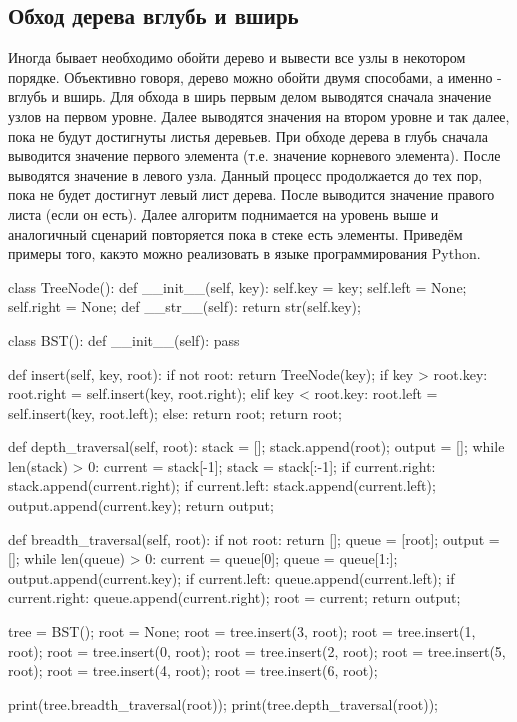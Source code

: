 \subsection{Обход дерева вглубь и вширь}

Иногда бывает необходимо обойти дерево и вывести все узлы в некотором порядке.
Объективно говоря, дерево можно обойти двумя способами, а именно - вглубь и вширь.
Для обхода в ширь первым делом выводятся сначала значение узлов на первом уровне.
Далее выводятся значения на втором уровне и так далее, пока не будут достигнуты
листья деревьев. При обходе дерева в глубь сначала выводится значение первого элемента (т.е. значение 
корневого элемента). После выводятся значение в левого узла. Данный процесс продолжается до тех пор, 
пока не будет достигнут левый лист дерева. После выводится значение правого листа (если он есть).
Далее алгоритм поднимается на уровень выше и аналогичный сценарий повторяется пока в стеке 
есть элементы. Приведём примеры того, какэто можно реализовать в языке программирования Python.

\begin{python}
class TreeNode():
	def __init__(self, key):
		self.key = key;
		self.left = None;
		self.right = None;
	def __str__(self):
		return str(self.key);

class BST():
	def __init__(self):
		pass

	def insert(self, key, root):
		if not root:
			return TreeNode(key);
		if key > root.key:
			root.right = self.insert(key, root.right);
		elif key < root.key:
			root.left = self.insert(key, root.left);
		else:
			return root;
		return root;

	def depth_traversal(self, root):
		stack = [];
		stack.append(root);
		output = [];
		while len(stack) > 0:
			current = stack[-1];
			stack = stack[:-1];
			if current.right:
				stack.append(current.right);
			if current.left:
				stack.append(current.left);
			output.append(current.key);
		return output;

	def breadth_traversal(self, root):
		if not root:
			return [];
		queue = [root];
		output = [];
		while len(queue) > 0:
			current = queue[0];
			queue = queue[1:];
			output.append(current.key);
			if current.left:
				queue.append(current.left);
			if current.right:
				queue.append(current.right);
			root = current;
		return output;

tree = BST();
root = None;
root = tree.insert(3, root);
root = tree.insert(1, root);
root = tree.insert(0, root);
root = tree.insert(2, root);
root = tree.insert(5, root);
root = tree.insert(4, root);
root = tree.insert(6, root);

print(tree.breadth_traversal(root));
print(tree.depth_traversal(root));

\end{python}


